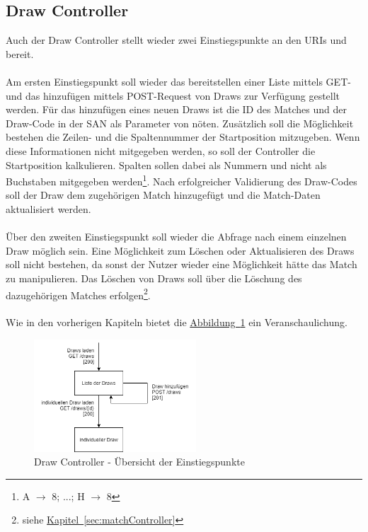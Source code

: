 \subsection{Draw Controller}\label{sec:drawController}
Auch der Draw Controller stellt wieder zwei Einstiegspunkte an den \glspl{URI}  und  bereit. \\
\\
Am ersten Einstiegspunkt soll wieder das bereitstellen einer Liste mittels GET- und das hinzufügen mittels POST-Request von Draws zur Verfügung gestellt werden. Für das hinzufügen eines neuen Draws ist die ID des Matches und der Draw-Code in der \gls{SAN} als Parameter von nöten. Zusätzlich soll die Möglichkeit bestehen die Zeilen- und die Spaltennummer der Startposition mitzugeben. Wenn diese Informationen nicht mitgegeben werden, so soll der Controller die Startposition kalkulieren. Spalten sollen dabei als Nummern und nicht als Buchstaben mitgegeben werden\footnote{A $\rightarrow$ 8; ...; H $\rightarrow$ 8}. Nach erfolgreicher Validierung des Draw-Codes soll der Draw dem zugehörigen Match hinzugefügt und die Match-Daten aktualisiert werden.\\
\\
Über den zweiten Einstiegspunkt soll wieder die Abfrage nach einem einzelnen Draw möglich sein. Eine Möglichkeit zum Löschen oder Aktualisieren des Draws soll nicht bestehen, da sonst der Nutzer wieder eine Möglichkeit hätte das Match zu manipulieren. Das Löschen von Draws soll über die Löschung des dazugehörigen Matches erfolgen\footnote{siehe \hyperref[sec:matchController]{Kapitel~\ref{sec:matchController}}}.\\
\\
Wie in den vorherigen Kapiteln bietet die \hyperref[fig:drawController]{Abbildung~\ref{fig:drawController}} ein Veranschaulichung.
\begin{figure}[htb]
	\includegraphics[width=0.54\textwidth]{images/draw-controller.png}
	\caption{Draw Controller - Übersicht der Einstiegspunkte}
	\label{fig:drawController}
\end{figure}